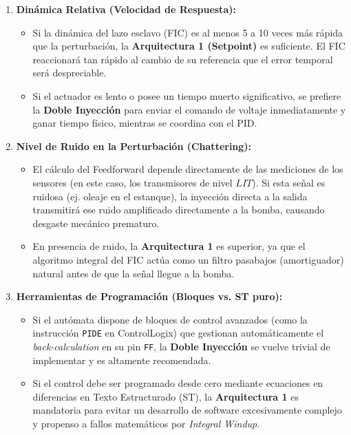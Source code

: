 \begin{enumerate}
    \item \textbf{Dinámica Relativa (Velocidad de Respuesta):}
    \begin{itemize}
        \item Si la dinámica del lazo esclavo (FIC) es al menos 5 a 10 veces más rápida que la perturbación, la \textbf{Arquitectura 1 (Setpoint)} es suficiente. El FIC reaccionará tan rápido al cambio de su referencia que el error temporal será despreciable.
        \item Si el actuador es lento o posee un tiempo muerto significativo, se prefiere la \textbf{Doble Inyección} para enviar el comando de voltaje inmediatamente y ganar tiempo físico, mientras se coordina con el PID.
    \end{itemize}

    \item \textbf{Nivel de Ruido en la Perturbación (Chattering):}
    \begin{itemize}
        \item El cálculo del Feedforward depende directamente de las mediciones de los sensores (en este caso, los transmisores de nivel $LIT$). Si esta señal es ruidosa (ej. oleaje en el estanque), la inyección directa a la salida transmitirá ese ruido amplificado directamente a la bomba, causando desgaste mecánico prematuro.
        \item En presencia de ruido, la \textbf{Arquitectura 1} es superior, ya que el algoritmo integral del FIC actúa como un filtro pasabajos (amortiguador) natural antes de que la señal llegue a la bomba.
    \end{itemize}

    \item \textbf{Herramientas de Programación (Bloques vs. ST puro):}
    \begin{itemize}
        \item Si el autómata dispone de bloques de control avanzados (como la instrucción \texttt{PIDE} en ControlLogix) que gestionan automáticamente el \textit{back-calculation} en su pin \texttt{FF}, la \textbf{Doble Inyección} se vuelve trivial de implementar y es altamente recomendada.
        \item Si el control debe ser programado desde cero mediante ecuaciones en diferencias en Texto Estructurado (ST), la \textbf{Arquitectura 1} es mandatoria para evitar un desarrollo de software excesivamente complejo y propenso a fallos matemáticos por \textit{Integral Windup}.
    \end{itemize}


\end{enumerate}
